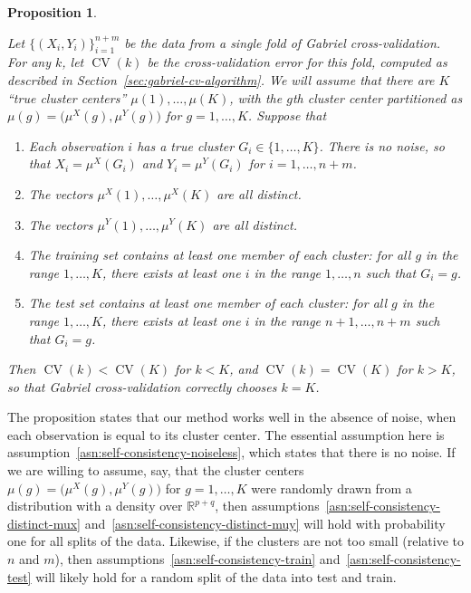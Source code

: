 \documentclass[12pt]{article}
\newtheorem{proposition}{Proposition}
\newcommand{\CV}{\operatorname{CV}}
\newcommand{\R}{\mathbb{R}}
\newcommand{\muX}{\mu^{X}}
\newcommand{\muY}{\mu^{Y}}
\begin{document}
\begin{proposition}\label{prop:self-consistency}

Let $\{ (X_i, Y_i) \}_{i=1}^{n+m}$ be the data from a single fold of Gabriel
cross-validation.  For any $k$, let $\CV(k)$ be the cross-validation error for
this fold, computed as described in Section~\ref{sec:gabriel-cv-algorithm}.
We will assume that there are $K$ ``true cluster centers''
$\mu(1), \dotsc,\mu(K)$, with
the $g$th cluster center partitioned as $\mu(g) = \bigl(\muX(g),
\muY(g)\bigr)$ for $g = 1, \dotsc, K$.  Suppose that
\begin{enumerate}[label=(\roman*)]
  \item \label{asn:self-consistency-noiseless}
    Each observation $i$ has a true cluster $G_i \in \{ 1, \dotsc, K \}$.
    There is no noise, so that $X_i = \muX({G_i})$ and $Y_i = \muY(G_i)$ for
    $i = 1, \dotsc, n+m$.
  \item \label{asn:self-consistency-distinct-mux}
    The vectors $\muX(1), \dotsc,\muX(K)$ are all distinct.
  \item \label{asn:self-consistency-distinct-muy}
    The vectors $\muY(1), \dotsc,\muY(K)$ are all distinct.
  \item \label{asn:self-consistency-train}
    The training set contains at least one member of each cluster: for all $g$
    in the range $1, \dotsc, K$, there exists at least one $i$ in the range
    $1, \dotsc, n$ such that $G_i = g$.
  \item \label{asn:self-consistency-test}
    The test set contains at least one member of each cluster: for all $g$ in
    the range $1, \dotsc, K$, there exists at least one $i$ in the range $n+1,
    \dotsc, n+m$ such that $G_i = g$.
\end{enumerate}
Then $\CV(k) < \CV(K)$ for $k < K$, and $\CV(k) = \CV(K)$ for $k > K$, so that
Gabriel cross-validation correctly chooses $k = K$.
\end{proposition}

The proposition states that our method works well in the absence of noise,
when each observation is equal to its cluster center.  The essential
assumption here is assumption~\ref{asn:self-consistency-noiseless}, which states
that there is no noise.  If we are willing to assume, say, that the cluster
centers~$\mu(g) = \bigl(\muX(g),\muY(g)\bigr)$ for $g = 1, \dotsc, K$ were
randomly drawn from a distribution with a density over $\R^{p+q}$, then
assumptions~\ref{asn:self-consistency-distinct-mux}
and~\ref{asn:self-consistency-distinct-muy} will hold with probability one for
all splits of the data. Likewise, if the clusters are not too small (relative
to $n$ and $m$), then assumptions~\ref{asn:self-consistency-train}
and~\ref{asn:self-consistency-test} will likely hold for a random split of the
data into test and train.
\end{document}
